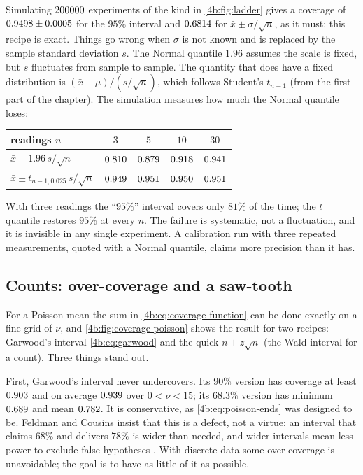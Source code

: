 Simulating $200000$ experiments of the kind in \cref{4b:fig:ladder} gives a
coverage of $0.9498\pm0.0005$ for the $95\%$ interval and
$0.6814$ for $\bar x\pm\sigma/\sqrt n$, as it must: this recipe is
exact. Things go wrong when $\sigma$ is not known and is replaced by the sample
standard deviation $s$. The Normal quantile $1.96$ assumes the scale is fixed,
but $s$ fluctuates from sample to sample. The quantity that does have a fixed
distribution is $(\bar x-\mu)/(s/\sqrt n)$, which follows Student's $t_{n-1}$
(from the first part of the chapter). The simulation measures how much the
Normal quantile loses:
\begin{center}
\begin{tabular}{lcccc}
\toprule
readings $n$ & $3$ & $5$ & $10$ & $30$\\
\midrule
$\bar x\pm1.96\,s/\sqrt n$ & $0.810$ & $0.879$ & $0.918$ & $0.941$\\
$\bar x\pm t_{n-1,0.025}\,s/\sqrt n$ & $0.949$ & $0.951$ & $0.950$ & $0.951$\\
\bottomrule
\end{tabular}
\end{center}
With three readings the ``$95\%$'' interval covers only $81\%$ of the time;
the $t$ quantile restores $95\%$ at every $n$. The failure is systematic, not a
fluctuation, and it is invisible in any single experiment. A calibration run
with three repeated measurements, quoted with a Normal quantile, claims more
precision than it has.

\subsection{Counts: over-coverage and a saw-tooth}
\label{4b:sec:coverage-poisson}

For a Poisson mean the sum in \eqref{4b:eq:coverage-function} can be done
exactly on a fine grid of $\nu$, and \cref{4b:fig:coverage-poisson} shows the
result for two recipes: Garwood's interval \eqref{4b:eq:garwood} and the quick
$n\pm z\sqrt n$ (the Wald interval for a count). Three things stand out.

First, Garwood's interval never undercovers. Its $90\%$ version has coverage
at least $0.903$ and on average $0.939$ over
$0<\nu<15$; its $68.3\%$ version has minimum $0.689$ and mean
$0.782$. It is conservative, as \eqref{4b:eq:poisson-ends} was
designed to be. Feldman and Cousins insist that this is a defect, not a
virtue: an interval that claims $68\%$ and delivers $78\%$ is wider than
needed, and wider intervals mean less power to exclude false hypotheses
\cite{FeldmanCousins1998}. With discrete data some over-coverage is
unavoidable; the goal is to have as little of it as possible.

